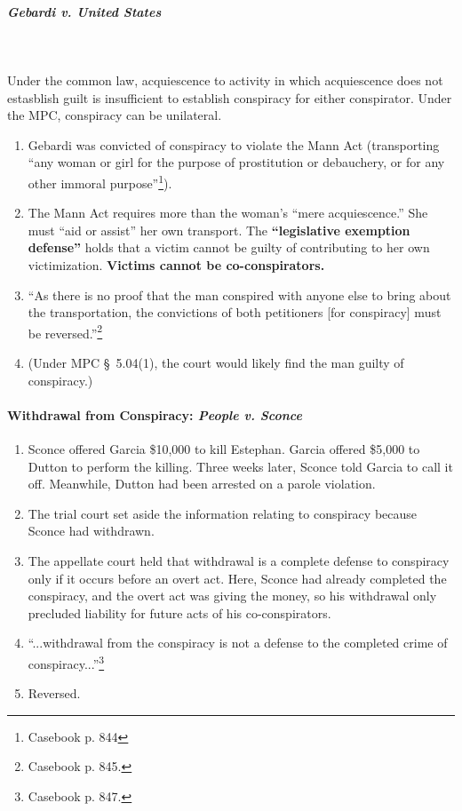 \paragraph{\emph{Gebardi v. United States}}
~\\\\
Under the common law, acquiescence to activity in which acquiescence does not 
estasblish guilt is insufficient to establish conspiracy for either 
conspirator. Under the MPC, conspiracy can be unilateral.

\begin{enumerate}
    \item Gebardi was convicted of conspiracy to violate the Mann Act 
    (transporting ``any woman or girl for the purpose of prostitution or 
    debauchery, or for any other immoral purpose''\footnote{Casebook p. 844}).
    \item The Mann Act requires more than the woman's ``mere acquiescence.'' 
    She must ``aid or assist'' her own transport. The \textbf{``legislative 
    exemption defense''} holds that a victim cannot be guilty of contributing 
    to her own victimization. \textbf{Victims cannot be co-conspirators.}
    \item ``As there is no proof that the man conspired with anyone else to 
    bring about the transportation, the convictions of both petitioners [for 
    conspiracy] must be reversed.''\footnote{Casebook p. 845.}
    \item (Under MPC \S\ 5.04(1), the court would likely find the man guilty 
    of conspiracy.)
\end{enumerate}

\paragraph{Withdrawal from Conspiracy: \emph{People v. Sconce}}

\begin{enumerate}
    \item Sconce offered Garcia \$10,000 to kill Estephan. Garcia offered 
    \$5,000 to Dutton to perform the killing. Three weeks later, Sconce told 
    Garcia to call it off. Meanwhile, Dutton had been arrested on a parole 
    violation.
    \item The trial court set aside the information relating to conspiracy 
    because Sconce had withdrawn.
    \item The appellate court held that withdrawal is a complete defense to 
    conspiracy only if it occurs before an overt act. Here, Sconce had already 
    completed the conspiracy, and the overt act was giving the money, so his 
    withdrawal only precluded liability for future acts of his 
    co-conspirators.
    \item ``...withdrawal from the conspiracy is not a defense to the 
    completed crime of conspiracy...''\footnote{Casebook p. 847.}
    \item Reversed.
\end{enumerate}

